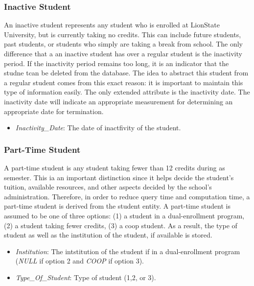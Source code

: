 \documentclass{article}
\begin{document}
  \subsubsection{Inactive Student}\label{sec:Concept:Student:Inactive}
    An inactive student represents any student who is enrolled at LionState University, but is currently taking no credits.  This can include future students, past students, or students who simply are taking a break from school.  The only difference that a an inactive student has over a regular student is the inactivity period.  If the inactivity period remains too long, it is an indicator that the studne tcan be deleted from the database.  The idea to abstract this student from a regular student comes from this exact reason: it is important to maintain this type of information easily.  The only extended attribute is the inactivity date.  The inactivity date will indicate an appropriate measurement for determining an appropriate date for termination.

    \begin{itemize}
      \item \textit{Inactivity\_Date}: The date of inactfivity of the student.
    \end{itemize}

  \subsubsection{Part-Time Student}\label{sec:Concept:Student:PartTime}
    A part-time student is any student taking fewer than 12 credits during as semester.  This ia an important distinction since it helps decide the student's tuition, available resources, and other aspects decided by the school's administration.  Therefore, in order to reduce query time and computation time, a part-time student is derived from the student entity.  A part-time student is assumed to be one of three options: (1) a student in a dual-enrollment program, (2) a student taking fewer credits, (3) a coop student.  As a result, the type of student as well as the institution of the student, if available is stored.

    \begin{itemize}
      \item \textit{Institution}: The intstitution of the student if in a dual-enrollment program (\textit{NULL} if option 2 and \textit{COOP} if option 3).
      \item \textit{Type\_Of\_Student}: Type of student (1,2, or 3).
    \end{itemize}
\end{document}
